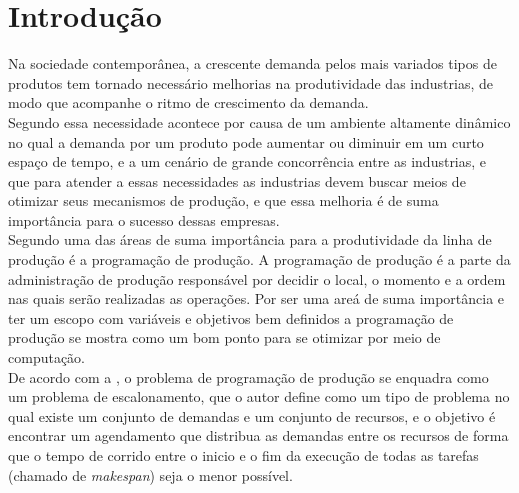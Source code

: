 \chapter{Introdução}

Na sociedade contemporânea, a crescente demanda pelos mais variados tipos de produtos tem tornado necessário melhorias na produtividade das industrias, de modo que acompanhe o ritmo de crescimento da demanda.\\
Segundo \citeauthor{Wari2016} essa necessidade acontece por causa de um ambiente altamente dinâmico no qual a demanda por um produto pode aumentar ou diminuir em um curto espaço de tempo, e a um cenário de grande concorrência entre as industrias, e que para atender a essas necessidades as industrias devem buscar meios de otimizar seus mecanismos de produção, e que essa melhoria é de suma importância para o sucesso dessas empresas.\\

Segundo \citeauthor{Xhafa2008} uma das áreas de suma importância para a produtividade da linha de produção é a programação de produção. 
A programação de produção é a parte da administração de produção responsável por decidir o local, o momento e a ordem nas quais serão realizadas as operações. 
Por ser uma areá de suma importância e ter um escopo com variáveis e objetivos bem definidos a programação de produção se mostra como um bom ponto para se otimizar por meio de computação.\\

De acordo com a \citeauthor{Bagchi1999}, o problema de programação de produção se enquadra como um problema de escalonamento, que o autor define como um tipo de problema no qual existe um conjunto de demandas e um conjunto de recursos, e o objetivo é encontrar um agendamento que distribua as demandas entre os recursos de forma que o tempo de corrido entre o inicio e o fim da execução de todas as tarefas (chamado de \textit{makespan}) seja o menor possível.\\

